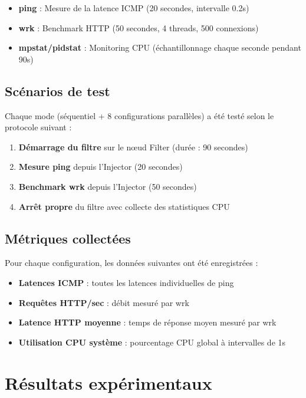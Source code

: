 \documentclass[12pt,a4paper]{article}
\begin{document}
\begin{itemize}
    \item \textbf{ping} : Mesure de la latence ICMP (20 secondes, intervalle 0.2s)
    \item \textbf{wrk} : Benchmark HTTP (50 secondes, 4 threads, 500 connexions)
    \item \textbf{mpstat/pidstat} : Monitoring CPU (échantillonnage chaque seconde pendant 90s)
\end{itemize}

\subsection{Scénarios de test}

Chaque mode (séquentiel + 8 configurations parallèles) a été testé selon le protocole suivant :

\begin{enumerate}
    \item \textbf{Démarrage du filtre} sur le nœud Filter (durée : 90 secondes)
    \item \textbf{Mesure ping} depuis l'Injector (20 secondes)
    \item \textbf{Benchmark wrk} depuis l'Injector (50 secondes)
    \item \textbf{Arrêt propre} du filtre avec collecte des statistiques CPU
\end{enumerate}

\subsection{Métriques collectées}

Pour chaque configuration, les données suivantes ont été enregistrées :

\begin{itemize}
    \item \textbf{Latences ICMP} : toutes les latences individuelles de ping
    \item \textbf{Requêtes HTTP/sec} : débit mesuré par wrk
    \item \textbf{Latence HTTP moyenne} : temps de réponse moyen mesuré par wrk
    \item \textbf{Utilisation CPU système} : pourcentage CPU global à intervalles de 1s
\end{itemize}

\section{Résultats expérimentaux}
\end{document}
